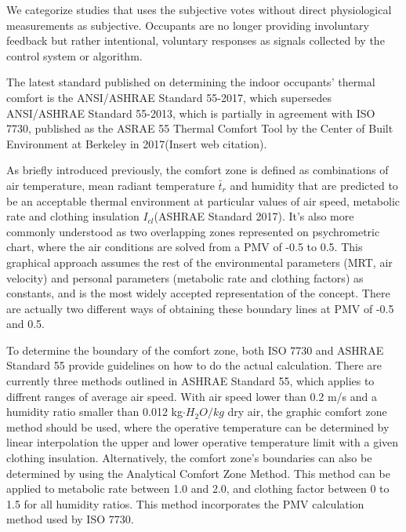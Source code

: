 We categorize studies that uses the subjective votes without direct physiological measurements as subjective. Occupants are no longer providing involuntary feedback but rather intentional, voluntary responses as signals collected by the control system or algorithm. 






The latest standard published on determining the indoor occupants' thermal comfort is the ANSI/ASHRAE Standard 55-2017, which supersedes ANSI/ASHRAE Standard 55-2013, which is partially in agreement with ISO 7730, published as the ASRAE 55 Thermal Comfort Tool by the Center of Built Environment at Berkeley in 2017(Insert web citation). 

As briefly introduced previously, the comfort zone is defined as combinations of air temperature, mean radiant temperature $\bar t_r$  and humidity that are predicted to be an acceptable thermal environment at particular values of air speed, metabolic rate and clothing insulation $I_{cl}$(ASHRAE Standard 2017). It's also more commonly understood as two overlapping zones represented on psychrometric chart, where the air conditions are solved from a PMV of -0.5 to 0.5. This graphical approach assumes the rest of the environmental parameters (MRT, air velocity) and personal parameters (metabolic rate and clothing factors) as constants, and is the most widely accepted representation of the concept. There are actually two different ways of obtaining these boundary lines at PMV of -0.5 and 0.5. %

To determine the boundary of the comfort zone, both ISO 7730 and ASHRAE Standard 55 provide guidelines on how to do the actual calculation. There are currently three methods outlined in ASHRAE Standard 55, which applies to diffrent ranges of average air speed. With air speed lower than 0.2 m/s and a humidity ratio smaller than 0.012 kg$\cdot H_2O/kg$ dry air, the graphic comfort zone method should be used, where the operative temperature can be determined by linear interpolation the upper and lower operative temperature limit with a given clothing insulation. Alternatively, the comfort zone's boundaries can also be determined by using the Analytical Comfort Zone Method. This method can be applied to metabolic rate between 1.0 and 2.0, and clothing factor between 0 to 1.5 for all humidity ratios. This method incorporates the PMV calculation method used by ISO 7730.